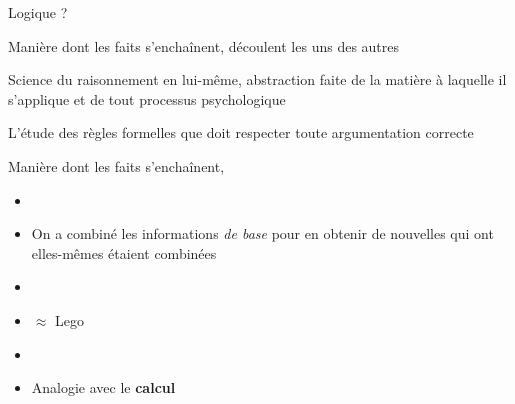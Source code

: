 \begin{frame}
	 Logique ?\pause\newline
	 \textcolor{white}{lol}
	\begin{description}[labelindent=6pt,style=multiline,leftmargin=1.3in]
		 \setlength\itemsep{1.4em}
		 \item[Larousse] Manière dont les faits s'enchaînent, découlent les uns des autres\pause
		\item[Larousse bis] Science du raisonnement en lui-même, abstraction faite de la matière à laquelle il s'applique et de tout processus psychologique\pause
		

		\item[Wikipedia] L'étude des règles formelles que doit respecter toute argumentation correcte

	\end{description}


\end{frame}
 	
\begin{frame}
	\begin{description}[labelindent=6pt,style=multiline,leftmargin=1.3in]
		 \setlength\itemsep{1.4em}
	  \item[Larousse] Manière dont les faits s'enchaînent, \pause\pause
	\end{description}

\begin{itemize}
\item[] \textcolor{white}{lol}
\item On a combiné les informations \textit{de base} pour en obtenir de nouvelles \pause qui ont elles-mêmes étaient combinées\pause
\item[] \textcolor{white}{lol}
\item $\approx$ Lego\pause
\item[] \textcolor{white}{lol}
\item Analogie avec le \textbf{calcul}
\end{itemize}

\end{frame}



